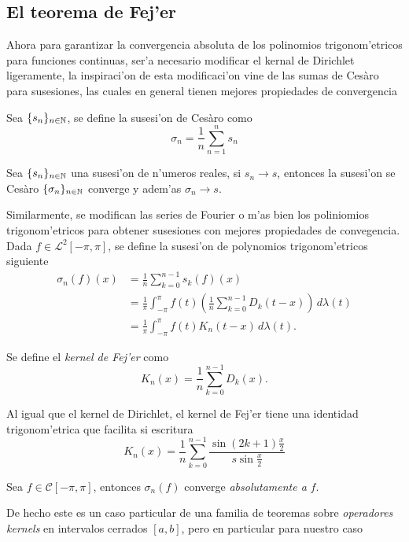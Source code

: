 \documentclass[main.tex]{subfiles}
\begin{document}
    \subsection{El teorema de Fej'er}
    \noindent Ahora para garantizar la convergencia absoluta de los polinomios trigonom'etricos para funciones continuas, ser'a necesario modificar el kernal de Dirichlet ligeramente, la inspiraci'on de esta modificaci'on vine de las sumas de Ces\`aro para susesiones, las cuales en general tienen mejores propiedades de convergencia
    \begin{def.}
      Sea \(\{s_{n}\}_{n\in \mathbb N }\), se define la susesi'on de Ces\`aro como
      \[
        \sigma_{n}=\frac{1}{n}\sum_{n=1}^{n}s_{n}
      \]
      \end{def.}
    \begin{teorema}
      Sea \(\{s_{n}\}_{n\in \mathbb N }\) una susesi'on de n'umeros reales, si \(s_{n}\to s\), entonces la susesi'on se Ces\`aro \(\{\sigma_{n}\}_{n\in \mathbb N }\) converge y adem'as \(\sigma_{n}\to s\).
    \end{teorema}
    Similarmente, se modifican las series de Fourier o m'as bien los poliniomios trigonom'etricos para obtener susesiones con mejores propiedades de convegencia. Dada \(f\in\mathcal{L}^{2}[-\pi,\pi]\), se define la susesi'on de polynomios trigonom'etricos siguiente
    \begin{align*}
      \sigma_{n}(f)(x)&=\frac{1}{n}\sum_{k=0}^{n-1}s_{k}(f)(x)\\
      &=\frac{1}{\pi}\int_{-\pi}^{\pi} f(t)\left(\frac{1}{n}\sum_{k=0}^{n-1}D_{k}(t-x)\right)\,d\lambda(t)\\
      &=\frac{1}{\pi}\int_{-\pi}^{\pi} f(t)K_{n}(t-x)\,d\lambda(t).
    \end{align*}
    \begin{def.}
      Se define el \emph{kernel de Fej'er} como
      \[
        K_{n}(x)=\frac{1}{n}\sum_{k=0}^{n-1}D_{k}(x).
      \]
    \end{def.}
    Al igual que el kernel de Dirichlet, el kernel de Fej'er tiene una identidad trigonom'etrica que facilita si escritura
    \[
      K_{n}(x)=\frac{1}{n}\sum_{k=0}^{n-1}\frac{\sin(2k+1)\frac{x}{2}}{s\sin\frac{x}{2}}
    \]
    \begin{teorema}
      Sea \(f\in\mathcal{C}[-\pi,\pi]\), entonces \(\sigma_n(f)\) converge \emph{absolutamente a} \(f\).
    \end{teorema}
    De hecho este es un caso particular de una familia de teoremas sobre \emph{operadores kernels} en intervalos cerrados \([a,b]\), pero en particular para nuestro caso
\end{document}
